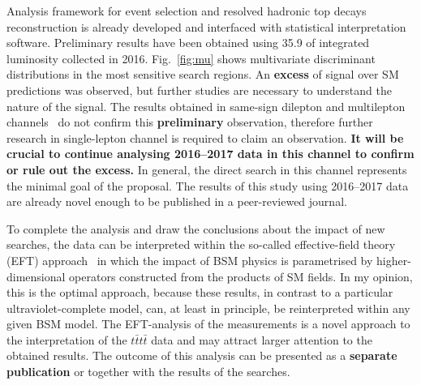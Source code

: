 Analysis framework for event selection and resolved hadronic top decays reconstruction is already developed and interfaced with statistical interpretation software. Preliminary results have been obtained using 35.9 \invfb of integrated luminosity collected in 2016. Fig.~\ref{fig:mu} shows multivariate discriminant distributions in the most sensitive search regions. An \textbf{excess} of signal over SM predictions was observed, but further studies are necessary to understand the nature of the signal. The results obtained in same-sign dilepton and multilepton channels~\cite{Sirunyan:2017roi} do not confirm this \textbf{preliminary} observation, therefore further research in single-lepton channel is required to claim an observation. \textbf{It will be crucial to continue analysing 2016--2017 data in this channel to confirm or rule out the excess.} In general, the direct search in this channel represents the minimal goal of the proposal. The results of this study using 2016--2017 data are already novel enough to be published in a peer-reviewed journal. 

To complete the analysis and draw the conclusions about the impact of new searches, the data can be interpreted within the so-called effective-field theory (EFT) approach~\cite{Lillie:2007hd} in which the impact of BSM physics is parametrised by higher-dimensional operators constructed from the products of SM fields. In my opinion, this is the optimal approach, because these results, in contrast to a particular ultraviolet-complete model, can, at least in principle, be reinterpreted within any given BSM model. The EFT-analysis of the measurements is a novel approach to the interpretation of the $t\bar{t}t\bar{t}$ data and may attract larger attention to the obtained results. The outcome of this analysis can be presented as a \textbf{separate publication} or together with the results of the searches. 


